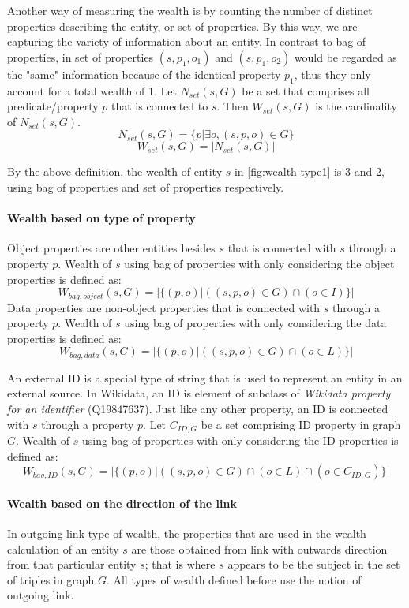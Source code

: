 Another way of measuring the wealth is by counting the number of distinct properties describing the entity, or set of properties. By this way, we are capturing the variety of information about an entity. In contrast to bag of properties, in set of properties \((s, p_1, o_1)\) and \((s, p_1, o_2)\) would be regarded as the "same" information because of the identical property \(p_1\), thus they only account for a total wealth of 1. Let \(N_{set}(s,G)\) be a set that comprises all predicate/property \(p\) that is connected to \(s\). Then \(W_{set}(s, G)\) is the cardinality of \(N_{set}(s,G)\).
\[
    N_{set}(s, G) = \{p | \exists o, (s, p, o) \in G\}
\]
\[
    W_{set}(s, G) = |N_{set}(s,G)|
\]

By the above definition, the wealth of entity \(s\) in \autoref{fig:wealth-type1} is 3 and 2, using bag of properties and set of properties respectively.

\paragraph{Wealth based on type of property}
Object properties are other entities besides \(s\) that is connected with \(s\) through a property \(p\). Wealth of \(s\) using bag of properties with only considering the object properties is defined as:
\[
    W_{bag, object}(s, G) = |\{(p,o) | ((s, p, o) \in G) \cap (o \in I)\}|
\]
Data properties are non-object properties that is connected with \(s\) through a property \(p\). Wealth of \(s\) using bag of properties with only considering the data properties is defined as:
\[
    W_{bag, data}(s, G) = |\{(p,o) | ((s, p, o) \in G) \cap (o \in L)\}|
\]

An external ID is a special type of string that is used to represent an entity in an external source. In Wikidata, an ID is element of subclass of \textit{Wikidata property for an identifier} (Q19847637). Just like any other property, an ID is connected with \(s\) through a property \(p\). Let  \(C_{ID,G}\) be a set comprising ID property in graph \(G\). Wealth of \(s\) using bag of properties with only considering the ID properties is defined as:
\[
    W_{bag, ID}(s, G) = |\{(p,o) | ((s, p, o) \in G) \cap (o \in L) \cap (o \in C_{ID,G})\}|
\]

\paragraph{Wealth based on the direction of the link}
In outgoing link type of wealth, the properties that are used in the wealth calculation of an entity \(s\) are those obtained from link with outwards direction from that particular entity \(s\); that is where \(s\) appears to be the subject in the set of triples in graph \(G\). All types of wealth defined before use the notion of outgoing link.


